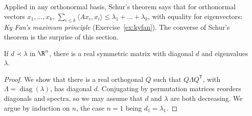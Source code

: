 Applied in any orthonormal basis, Schur's theorem says that for orthonormal vectors $x_1,\dots,x_k$,
$\sum_{i\le k}\langle Ax_i,x_i\rangle\le\lambda_1+\dots+\lambda_k$, with equality for eigenvectors: \emph{Ky Fan's maximum
principle} (Exercise~\ref{ex:kyfan}). The converse of Schur's theorem is the surprise of this section.

\begin{theorem}[Horn, 1954]\label{thm:horn}
If $d\prec\lambda$ in $\R^n$, there is a real symmetric matrix with diagonal $d$ and eigenvalues $\lambda$.
\end{theorem}
\begin{proof}
We show that there is a real orthogonal $Q$ such that $Q\Lambda Q^{\mathsf T}$, with $\Lambda=\operatorname{diag}(\lambda)$,
has diagonal $d$. Conjugating by permutation matrices reorders diagonals and spectra, so we may assume that $d$ and
$\lambda$ are both decreasing. We argue by induction on $n$, the case $n=1$ being $d_1=\lambda_1$.


\end{proof}
